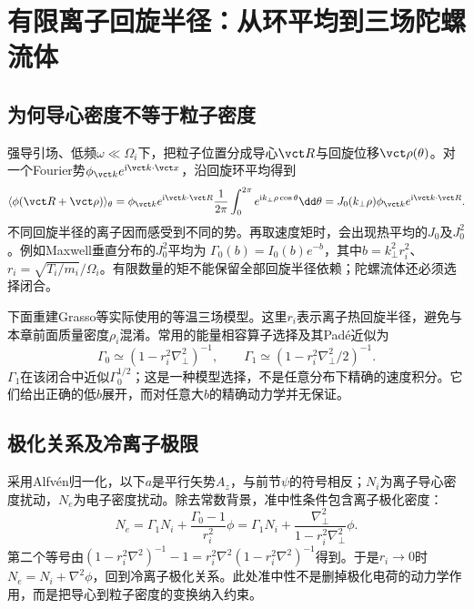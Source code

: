 
\section{有限离子回旋半径：从环平均到三场陀螺流体}
\subsection{为何导心密度不等于粒子密度}
强导引场、低频$\omega\ll\Omega_i$下，把粒子位置分成导心$\vct R$与回旋位移$\vct\rho(\theta)$。对一个Fourier势$\phi_{\vct k}e^{\mathrm i\vct k\cdot\vct x}$，沿回旋环平均得到
\begin{equation}
 \langle\phi(\vct R+\vct\rho)\rangle_\theta
 =\phi_{\vct k}e^{\mathrm i\vct k\cdot\vct R}
 \frac1{2\pi}\int_0^{2\pi}e^{\mathrm i k_\perp\rho\cos\theta}\dd\theta
 =J_0(k_\perp\rho)\phi_{\vct k}e^{\mathrm i\vct k\cdot\vct R}.
\end{equation}
不同回旋半径的离子因而感受到不同的势。再取速度矩时，会出现热平均的$J_0$及$J_0^2$。例如Maxwell垂直分布的$J_0^2$平均为
$\Gamma_0(b)=I_0(b)e^{-b}$，其中$b=k_\perp^2r_i^2$、$r_i=\sqrt{T_i/m_i}/\Omega_i$。有限数量的矩不能保留全部回旋半径依赖；陀螺流体还必须选择闭合。

下面重建Grasso等实际使用的等温三场模型。这里$r_i$表示离子热回旋半径，避免与本章前面质量密度$\rho_i$混淆。常用的能量相容算子选择及其Pad\'e近似为
\begin{equation}
 \Gamma_0\simeq(1-r_i^2\nabla_\perp^2)^{-1},\qquad
 \Gamma_1\simeq(1-r_i^2\nabla_\perp^2/2)^{-1}.
\end{equation}
$\Gamma_1$在该闭合中近似$\Gamma_0^{1/2}$；这是一种模型选择，不是任意分布下精确的速度积分。它们给出正确的低$b$展开，而对任意大$b$的精确动力学并无保证。

\subsection{极化关系及冷离子极限}
采用Alfvén归一化，以下$a$是平行矢势$A_z$，与前节$\psi$的符号相反；$N_i$为离子导心密度扰动，$N_e$为电子密度扰动。除去常数背景，准中性条件包含离子极化密度：
\begin{equation}
 N_e=\Gamma_1N_i+\frac{\Gamma_0-1}{r_i^2}\phi
 =\Gamma_1N_i+\frac{\nabla_\perp^2}{1-r_i^2\nabla_\perp^2}\phi.
 \label{eq:gyro_pol}
\end{equation}
第二个等号由$(1-r_i^2\nabla^2)^{-1}-1=
 r_i^2\nabla^2(1-r_i^2\nabla^2)^{-1}$得到。于是$r_i\to0$时
$N_e=N_i+\nabla^2\phi$，回到冷离子极化关系。此处准中性不是删掉极化电荷的动力学作用，而是把导心到粒子密度的变换纳入约束。

